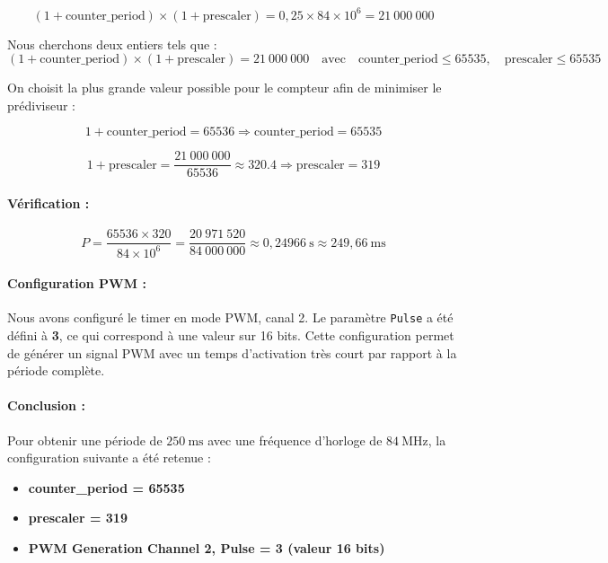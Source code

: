 \documentclass{article}
\begin{document}
    \[
    (1 + \text{counter\_period}) \times (1 + \text{prescaler}) = 0{,}25 \times 84 \times 10^6 = 21~000~000
    \]
    
    Nous cherchons deux entiers tels que :
    \[
    (1 + \text{counter\_period}) \times (1 + \text{prescaler}) = 21~000~000
    \quad \text{avec} \quad \text{counter\_period} \leq 65535, \quad \text{prescaler} \leq 65535
    \]
    
    On choisit la plus grande valeur possible pour le compteur afin de minimiser le prédiviseur :
    
    \[
    1 + \text{counter\_period} = 65536 \Rightarrow \text{counter\_period} = 65535
    \]
    
    \[
    1 + \text{prescaler} = \frac{21~000~000}{65536} \approx 320.4 \Rightarrow \text{prescaler} = 319
    \]
    
    \paragraph{Vérification :}
    
    \[
    P = \frac{65536 \times 320}{84 \times 10^6} = \frac{20~971~520}{84~000~000} \approx 0{,}24966~\text{s} \approx 249{,}66~\text{ms}
    \]
    
    \paragraph{Configuration PWM :}
    
    Nous avons configuré le timer en mode PWM, canal 2. Le paramètre \texttt{Pulse} a été défini à \textbf{3}, ce qui correspond à une valeur sur 16 bits. Cette configuration permet de générer un signal PWM avec un temps d’activation très court par rapport à la période complète.
    
    \paragraph{Conclusion :}
    
    Pour obtenir une période de $250~\text{ms}$ avec une fréquence d’horloge de $84~\text{MHz}$, la configuration suivante a été retenue :
    \begin{itemize}
        \item \textbf{counter\_period = 65535}
        \item \textbf{prescaler = 319}
        \item \textbf{PWM Generation Channel 2, Pulse = 3 (valeur 16 bits)}
    \end{itemize}
\end{document}
